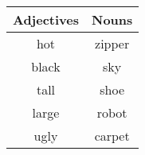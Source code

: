 \begin{center}
	\begin{tabular}{|c|c|}	\hline
		\textbf{Adjectives} & \textbf{Nouns} 	\\ \hline
		hot					&  zipper 			\\ \hline
		black				&  sky				\\ \hline
		tall				&  shoe				\\ \hline
		large				&  robot			\\ \hline
		ugly				&  carpet			\\ \hline
	\end{tabular}
\end{center}
